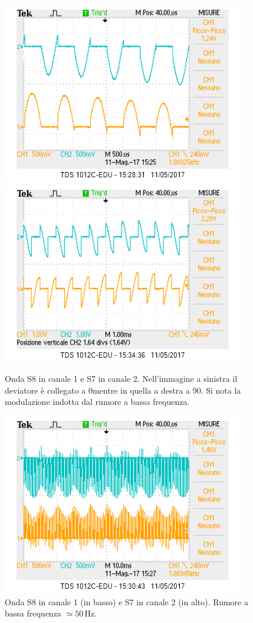 \documentclass[10pt,a4paper]{article}
\begin{document}
\begin{figure}[!htb]
  \centering
  \includegraphics[scale=0.75]{dev0ch1S8-ch2S7.png}\includegraphics[scale=0.75]{dev90ch1S8-ch2S7.png}
\caption{Onda S8 in canale 1 e S7 in canale 2. Nell'immagine a sinistra il deviatore è collegato a 0\degree mentre in quella a destra a 90\degree . Si nota la modulazione indotta dal rumore a bassa frequenza.\label{osc:S7S8}}
\end{figure}

\begin{figure}[!htb]
  \centering
  \includegraphics[scale=0.75]{perFedech1S8-ch2S7.png}
\caption{Onda S8 in canale 1 (in basso) e S7 in canale 2 (in alto). Rumore a bassa frequenza $\simeq 50\,\mbox{Hz}$.\label{osc:rumore50hz}}
\end{figure}
\end{document}
